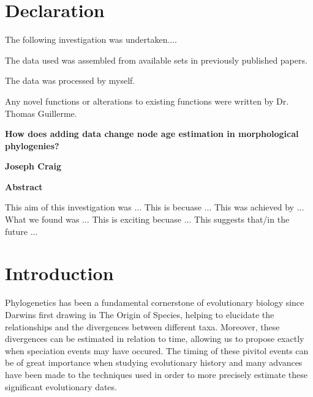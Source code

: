 \documentclass[11pt,letterpaper]{article}
\begin{document}
\newpage

\section*{Declaration}

The following investigation was undertaken....

The data used was assembled from available sets in previously published papers.

The data was processed by myself.

Any novel functions or alterations to existing functions were written by Dr. Thomas Guillerme.


\newpage

\setcounter{page}{1}
\thispagestyle{plain}
\begin{center}
	\large
	\textbf{How does adding data change node age estimation in morphological phylogenies?}

	\vspace{0.4cm}
	\textbf{Joseph Craig}

	\vspace{0.9cm}
	\textbf{Abstract}
\end{center}

This aim of this investigation was ...
This is becuase ...
This was achieved by ...
What we found was ... 
This is exciting becuase ...
This suggests that/in the future ...

\newpage

\tableofcontents

\newpage

\section{Introduction}

Phylogenetics has been a fundamental cornerstone of evolutionary biology since Darwins first drawing in The Origin of Species, %
 helping to elucidate the relationships and the divergences between different taxa.
 Moreover, these divergences can be estimated in relation to time, allowing us to propose exactly %
  when speciation events may have occured.
The timing of these pivitol events can be of great importance when studying evolutionary history and many advances have been made to the techniques used in order to more precisely estimate these significant evolutionary dates. %
\end{document}
